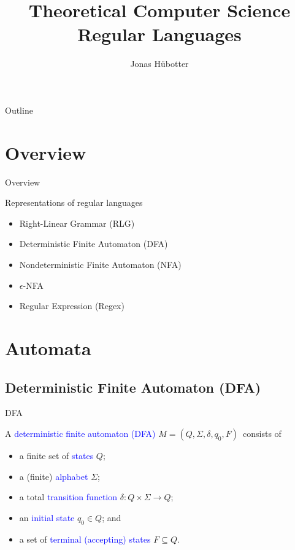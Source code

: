 \documentclass{beamer}
\title[Theoretical Computer Science]{Theoretical Computer Science \\ Regular Languages}
\author{Jonas Hübotter}
\date{}
\def\b{\textcolor{blue}}
\begin{document}
\begin{frame}
  \titlepage
\end{frame}

\begin{frame}[allowframebreaks]{Outline}
 \tableofcontents[subsubsectionstyle=hide]
\end{frame}

\section{Overview}

\begin{frame}{Overview}
    \begin{block}{Representations of regular languages}\pause
        \begin{itemize}
            \item Right-Linear Grammar (RLG)\pause
            \item Deterministic Finite Automaton (DFA)\pause
            \item Nondeterministic Finite Automaton (NFA)\pause
            \item $\epsilon$-NFA\pause
            \item Regular Expression (Regex)
        \end{itemize}
    \end{block}
\end{frame}

\section{Automata}

\subsection{Deterministic Finite Automaton (DFA)}

\begin{frame}{DFA}
    \begin{definition}
        A \b{deterministic finite automaton (DFA)} $M = (Q, \Sigma, \delta, q_0, F)$\pause\ consists of
        \begin{itemize}
            \item a finite set of \b{states} $Q$\pause;
            \item a (finite) \b{alphabet} $\Sigma$\pause;
            \item a total \b{transition function} $\delta: Q \times \Sigma \to Q$\pause;
            \item an \b{initial state} $q_0 \in Q$\pause; and
            \item a set of \b{terminal (accepting) states} $F \subseteq Q$.
        \end{itemize}
    \end{definition}
\end{frame}
\end{document}
